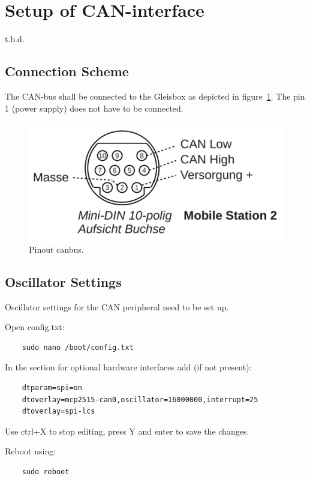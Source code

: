 \section{Setup of CAN-interface}
t.b.d.

\subsection{Connection Scheme}
The CAN-bus shall be connected to the Gleisbox as depicted in figure~\ref{fig:mobilestation2_din10}. The pin 1 (power supply) does not have to be connected.


\begin{figure}[h!]
	\centering
	\includegraphics[width=1.00\linewidth]{../figures/mobilestation2_din10.png}
	\caption{Pinout canbus.}
	\label{fig:mobilestation2_din10}
\end{figure}

\subsection{Oscillator Settings}
Oscillator settings for the CAN peripheral need to be set up.

Open config.txt:

\begin{verbatim}
	sudo nano /boot/config.txt
\end{verbatim}

In the section for optional hardware interfaces add (if not present):

\begin{verbatim}
	dtparam=spi=on
	dtoverlay=mcp2515-can0,oscillator=16000000,interrupt=25
	dtoverlay=spi-lcs
\end{verbatim}

Use ctrl+X to stop editing, press Y and enter to save the changes.

Reboot using:

\begin{verbatim}
	sudo reboot
\end{verbatim}

